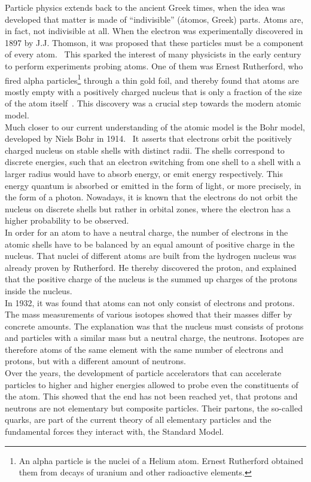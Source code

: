 Particle physics extends back to the ancient Greek times, when the idea was developed that matter is made of ``indivisible'' (\'atomos, Greek) parts.
Atoms are, in fact, not indivisible at all.
When the electron was experimentally discovered in 1897 by J.J. Thomson, it was proposed that these particles must be a component of every atom.~\cite[p. 13ff]{Griffiths}
This sparked the interest of many physicists in the early  century to perform experiments probing atoms.
One of them was Ernest Rutherford, who fired alpha particles\footnote{An alpha particle is the nuclei of a Helium atom. Ernest Rutherford obtained them from decays of uranium and other radioactive elements.} through a thin gold foil, and thereby found that atoms are mostly empty with a positively charged nucleus that is only a fraction of the size of the atom itself~\cite{GoldFoil}.
This discovery was a crucial step towards the modern atomic model.\\
Much closer to our current understanding of the atomic model is the Bohr model, developed by Niels Bohr in 1914.~\cite[p. 15]{Griffiths}
It asserts that electrons orbit the positively charged nucleus on stable shells with distinct radii.
The shells correspond to discrete energies, such that an electron switching from one shell to a shell with a larger radius would have to absorb energy, or emit energy respectively.
This energy quantum is absorbed or emitted in the form of light, or more precisely, in the form of a photon.
Nowadays, it is known that the electrons do not orbit the nucleus on discrete shells but rather in orbital zones, where the electron has a higher probability to be observed.\\
In order for an atom to have a neutral charge, the number of electrons in the atomic shells have to be balanced by an equal amount of positive charge in the nucleus.
That nuclei of different atoms are built from the hydrogen nucleus was already proven by Rutherford.
He thereby discovered the proton, and explained that the positive charge of the nucleus is the summed up charges of the protons inside the nucleus.\\
In 1932, it was found that atoms can not only consist of electrons and protons.~\cite[p. 15]{Griffiths}
The mass measurements of various isotopes showed that their masses differ by concrete amounts.
The explanation was that the nucleus must consists of protons and particles with a similar mass but a neutral charge, the neutrons.
Isotopes are therefore atoms of the same element with the same number of electrons and protons, but with a different amount of neutrons.\\
Over the years, the development of particle accelerators that can accelerate particles to higher and higher energies allowed to probe even the constituents of the atom.
This showed that the end has not been reached yet, that protons and neutrons are not elementary but composite particles.
Their partons, the so-called quarks, are part of the current theory of all elementary particles and the fundamental forces they interact with, the Standard Model.

